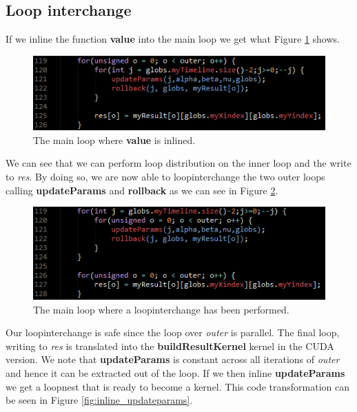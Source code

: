 \subsection{Loop interchange}
If we inline the function \textbf{value} into the main loop we get what Figure
\ref{fig:inline_value} shows.

\begin{figure}[!ht]
	\centering
		\includegraphics[scale=0.8]{input/figures/inline_value.png}
		\caption{The main loop where \textbf{value} is inlined.\label{fig:inline_value}}
\end{figure}

We can see that we can perform loop distribution on the inner loop and the
write to \emph{res}. By doing so, we are now able to loopinterchange the two
outer loops calling \textbf{updateParams} and \textbf{rollback} as we can see in
Figure \ref{fig:main_loopinterchange}.

\begin{figure}[!ht]
	\centering
		\includegraphics[scale=0.8]{input/figures/main_loopinterchange.png}
		\caption{The main loop where a loopinterchange has been performed.\label{fig:main_loopinterchange}}
\end{figure}

Our loopinterchange is safe since the loop over \emph{outer} is parallel.
The final loop, writing to \emph{res} is translated into the
\textbf{buildResultKernel} kernel in the CUDA version.
We note that \textbf{updateParams} is constant across all iterations of
\emph{outer} and hence it can be extracted out of the loop. If we then inline
\textbf{updateParams} we get a loopnest that is ready to become a kernel.
This code transformation can be seen in Figure \ref{fig:inline_updateparams}.

